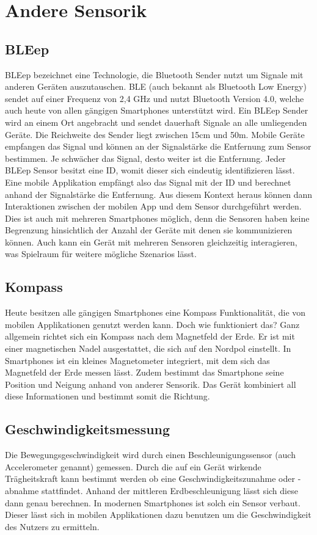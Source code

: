 \section{Andere Sensorik}\label{sensorik}

\subsection*{BLEep}
BLEep bezeichnet eine Technologie, die Bluetooth Sender nutzt um Signale mit anderen Geräten auszutauschen. BLE (auch bekannt als Bluetooth Low Energy) sendet auf einer Frequenz von 2,4 GHz und nutzt Bluetooth Version 4.0, welche auch heute von allen gängigen Smartphones unterstützt wird.
Ein BLEep Sender wird an einem Ort angebracht und sendet dauerhaft Signale an alle umliegenden Geräte. Die Reichweite des Sender liegt zwischen 15cm und 50m.
Mobile Geräte empfangen das Signal und können an der Signalstärke die Entfernung zum Sensor bestimmen. Je schwächer das Signal, desto weiter ist die Entfernung.
Jeder BLEep Sensor besitzt eine ID, womit dieser sich eindeutig identifizieren lässt.
Eine mobile Applikation empfängt also das Signal mit der ID und berechnet anhand der Signalstärke die Entfernung. Aus diesem Kontext heraus können dann Interaktionen zwischen der mobilen App und dem Sensor durchgeführt werden. Dies ist auch mit mehreren Smartphones möglich, denn die Sensoren haben keine Begrenzung hinsichtlich der Anzahl der Geräte mit denen sie kommunizieren können. Auch kann ein Gerät mit mehreren Sensoren gleichzeitig interagieren, was Spielraum für weitere mögliche Szenarios lässt.

\subsection*{Kompass}
Heute besitzen alle gängigen Smartphones eine Kompass Funktionalität, die von mobilen Applikationen genutzt werden kann. Doch wie funktioniert das?
Ganz allgemein richtet sich ein Kompass nach dem Magnetfeld der Erde. Er ist mit einer magnetischen Nadel ausgestattet, die sich auf den Nordpol einstellt.
In Smartphones ist ein kleines Magnetometer integriert, mit dem sich das Magnetfeld der Erde messen lässt. Zudem bestimmt das Smartphone seine Position und Neigung anhand von anderer Sensorik. Das Gerät kombiniert all diese Informationen und bestimmt somit die Richtung.

\subsection*{Geschwindigkeitsmessung}
Die Bewegungsgeschwindigkeit wird durch einen Beschleunigungssensor (auch Accelerometer genannt) gemessen. Durch die auf ein Gerät wirkende Trägheitskraft kann bestimmt werden ob  eine Geschwindigkeitszunahme oder -abnahme stattfindet. Anhand der mittleren Erdbeschleunigung lässt sich diese dann genau berechnen.
In modernen Smartphones ist solch ein Sensor verbaut. Dieser lässt sich in mobilen Applikationen dazu benutzen um die Geschwindigkeit des Nutzers zu ermitteln.

